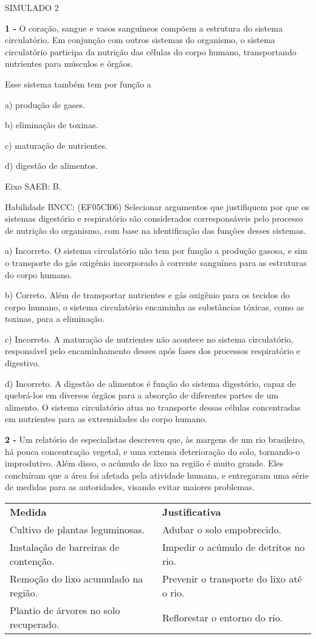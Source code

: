 \protect\hypertarget{_uuy9vykmorwg}{}{}SIMULADO 2

\textbf{1 -} O coração, sangue e vasos sanguíneos compõem a estrutura do
sistema circulatório. Em conjunção com outros sistemas do organismo, o
sistema circulatório participa da nutrição das células do corpo humano,
transportando nutrientes para músculos e órgãos.

Esse sistema também tem por função a

a) produção de gases.

b) eliminação de toxinas.

c) maturação de nutrientes.

d) digestão de alimentos.

Eixo SAEB: B.

Habilidade BNCC: (EF05CI06) Selecionar argumentos que justifiquem por
que os sistemas digestório e respiratório são considerados
corresponsáveis pelo processo de nutrição do organismo, com base na
identificação das funções desses sistemas.

a) Incorreto. O sistema circulatório não tem por função a produção
gasosa, e sim o transporte do gás oxigênio incorporado à corrente
sanguínea para as estruturas do corpo humano.

b) Correto. Além de transportar nutrientes e gás oxigênio para os
tecidos do corpo humano, o sistema circulatório encaminha as substâncias
tóxicas, como as toxinas, para a eliminação.

c) Incorreto. A maturação de nutrientes não acontece no sistema
circulatório, responsável pelo encaminhamento desses após fases dos
processos respiratório e digestivo.

d) Incorreto. A digestão de alimentos é função do sistema digestório,
capaz de quebrá-los em diversos órgãos para a absorção de diferentes
partes de um alimento. O sistema circulatório atua no transporte dessas
células concentradas em nutrientes para as extremidades do corpo humano.

\textbf{2 -} Um relatório de especialistas descreveu que, às margens de
um rio brasileiro, há pouca concentração vegetal, e uma extensa
deterioração do solo, tornando-o improdutivo. Além disso, o acúmulo de
lixo na região é muito grande. Eles concluíram que a área foi afetada
pela atividade humana, e entregaram uma série de medidas para as
autoridades, visando evitar maiores problemas.

\begin{longtable}[]{@{}ll@{}}
\toprule
\textbf{Medida} & \textbf{Justificativa}\tabularnewline
Cultivo de plantas leguminosas. & Adubar o solo
empobrecido.\tabularnewline
Instalação de barreiras de contenção. & Impedir o acúmulo de detritos no
rio.\tabularnewline
Remoção do lixo acumulado na região. & Prevenir o transporte do lixo até
o rio.\tabularnewline
Plantio de árvores no solo recuperado. & Reflorestar o entorno do
rio.\tabularnewline
\bottomrule
\end{longtable}

